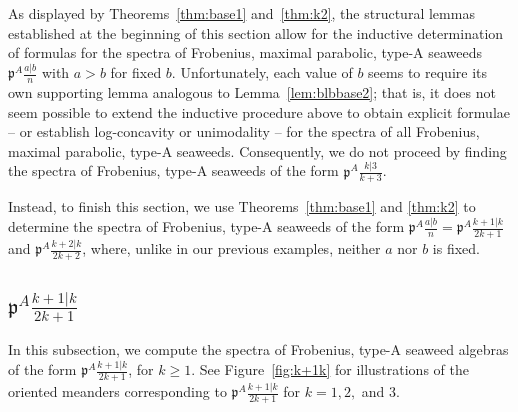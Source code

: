 \documentclass[letterpaper,10pt]{article}
\begin{document}
As displayed by Theorems~\ref{thm:base1} and~\ref{thm:k2}, the structural lemmas established at the beginning of this section allow for the inductive determination of formulas for the spectra of Frobenius, maximal parabolic, type-A seaweeds $\mathfrak{p}^A\frac{a|b}{n}$ with $a>b$ for fixed $b$. Unfortunately, each value of $b$ seems to require its own supporting lemma analogous to Lemma~\ref{lem:blbbase2}; that is, it does not seem possible to extend the inductive procedure above to obtain explicit formulae -- or establish log-concavity or unimodality -- for the spectra of all Frobenius, maximal parabolic, type-A seaweeds. Consequently, we do not proceed by finding the spectra of Frobenius, type-A seaweeds of the form $\mathfrak{p}^A\frac{k|3}{k+3}$.

Instead, to finish this section, we use Theorems~\ref{thm:base1} and \ref{thm:k2} to determine the spectra of Frobenius, type-A seaweeds of the form $\mathfrak{p}^A\frac{a|b}{n}=\mathfrak{p}^A\frac{k+1|k}{2k+1}$ and $\mathfrak{p}^A\frac{k+2|k}{2k+2}$, where, unlike in our previous examples, neither $a$ nor $b$ is fixed.

\subsection{$\mathfrak{p}^A\frac{k+1|k}{2k+1}$}

In this subsection, we compute the spectra of Frobenius, type-A seaweed algebras of the form $\mathfrak{p}^A\frac{k+1|k}{2k+1}$, for $k\ge 1$. See Figure~\ref{fig:k+1k} for illustrations of the oriented meanders corresponding to $\mathfrak{p}^A\frac{k+1|k}{2k+1}$ for $k=1,2,$ and 3.
\end{document}
